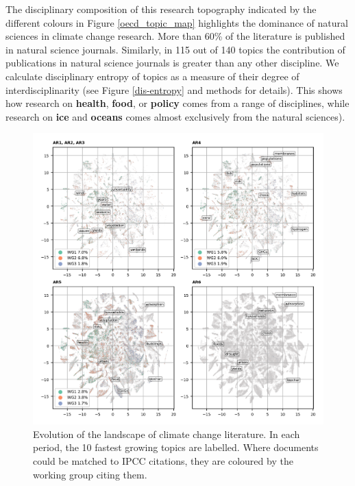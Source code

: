 \documentclass{article}
\begin{document}
\begin{linenumbers}
		
		The disciplinary composition of this research topography indicated by the different colours in Figure \ref{oecd_topic_map} highlights the dominance of natural sciences in climate change research. More than 60\% of the literature is published in natural science journals. Similarly, in 115 out of 140 topics the contribution of publications in natural science journals is greater than any other discipline. We calculate disciplinary entropy of topics as a measure of their degree of interdisciplinarity (see Figure \ref{dis-entropy} and methods for details). This shows how research on \textbf{health}, \textbf{food}, or \textbf{policy} comes from a range of disciplines, while research on \textbf{ice} and \textbf{oceans} comes almost exclusively from the natural sciences). 
		
		
		\begin{figure}
			\begin{center}
				\includegraphics[width=180mm]{../plots_pub/topic_evolution_4.png}
				\caption{Evolution of the landscape of climate change literature. In each period, the 10 fastest growing topics are labelled. Where documents could be matched to IPCC citations, they are coloured by the working group citing them.}
				\label{evolution-map}
			\end{center}
		\end{figure}
		

\end{linenumbers}
\end{document}

